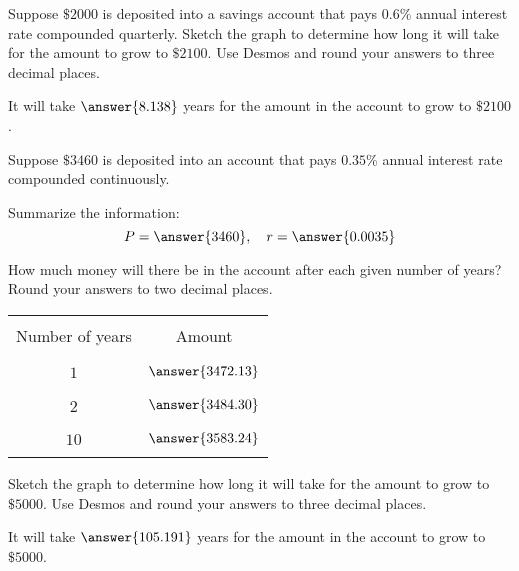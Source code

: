 \documentclass{ximera}
\begin{document}
  \begin{problem}\label{prob:160hom7prob5} 
  Suppose $\$2000$ is deposited into a savings account that pays $0.6\%$ annual interest rate compounded quarterly.  Sketch the graph to determine how long it will take for the amount to grow to  $\$2100$.  Use Desmos and round your answers to three decimal places.
  
  \begin{center}  
\end{center}

It will take $\answer{8.138}$ years for the amount in the account to grow to $\$2100$.  
  \end{problem}
  
  \begin{problem}\label{prob:160hom7prob6}
  Suppose $\$3460$ is deposited into an account that pays $0.35\%$ annual interest rate compounded continuously.  
  
  Summarize the information:
  $$P=\answer{3460},\quad r=\answer{0.0035}$$
  
  How much money will there be in the account after each given number of years?  Round your answers to two decimal places.
  \begin{center}
\begin{tabular}{|c|c|}
 \hline
 &   \\
Number of years &  Amount \\
 &  \\
  \hline
  &  \\
 $1$ & $\answer{3472.13}$ \\
  & \\
 \hline
 &  \\
 $2$ & $\answer{3484.30}$ \\
  & \\
 \hline
 &  \\
 $10$ & $\answer{3583.24}$ \\
  & \\
 \hline
   \end{tabular}
\end{center}    
Sketch the graph to determine how long it will take for the amount to grow to  $\$5000$.  Use Desmos and round your answers to three decimal places.
  
  \begin{center}  
\end{center}

It will take $\answer{105.191}$ years for the amount in the account to grow to $\$5000$.  
  \end{problem}
 
  
 
\end{document}

